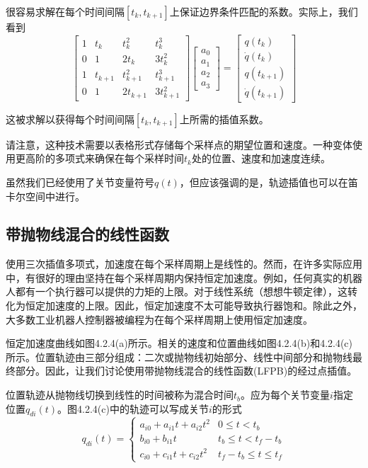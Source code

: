 \documentclass[UTF8]{ctexart}
\theoremstyle{definition}
\begin{document}
很容易求解在每个时间间隔$[t_k, t_{k+1}]$上保证边界条件匹配的系数。实际上，我们看到
\begin{equation}
    \begin{bmatrix} 1 & t_k & t_k^2 & t_k^3 \\ 0 & 1 & 2t_k & 3t_k^2 \\ 1 & t_{k+1} & t_{k+1}^2 & t_{k+1}^3 \\ 0 & 1 & 2t_{k+1} & 3t_{k+1}^2 \end{bmatrix} \begin{bmatrix} a_0 \\ a_1 \\ a_2 \\ a_3 \end{bmatrix} = \begin{bmatrix} q(t_k) \\ \dot{q}(t_k) \\ q(t_{k+1}) \\ \dot{q}(t_{k+1}) \end{bmatrix}
\end{equation}

这被求解以获得每个时间间隔$[t_k, t_{k+1}]$上所需的插值系数。

请注意，这种技术需要以表格形式存储每个采样点的期望位置和速度。一种变体使用更高阶的多项式来确保在每个采样时间$t_k$处的位置、速度和加速度连续。

虽然我们已经使用了关节变量符号$q(t)$，但应该强调的是，轨迹插值也可以在笛卡尔空间中进行。

\subsection{带抛物线混合的线性函数}

使用三次插值多项式，加速度在每个采样周期上是线性的。然而，在许多实际应用中，有很好的理由坚持在每个采样周期内保持恒定加速度。例如，任何真实的机器人都有一个执行器可以提供的力矩的上限。对于线性系统（想想牛顿定律），这转化为恒定加速度的上限。因此，恒定加速度不太可能导致执行器饱和。除此之外，大多数工业机器人控制器被编程为在每个采样周期上使用恒定加速度。

恒定加速度曲线如图4.2.4(a)所示。相关的速度和位置曲线如图4.2.4(b)和4.2.4(c)所示。位置轨迹由三部分组成：二次或抛物线初始部分、线性中间部分和抛物线最终部分。因此，让我们讨论使用带抛物线混合的线性函数(LFPB)的经过点插值。

位置轨迹从抛物线切换到线性的时间被称为混合时间$t_b$。应为每个关节变量$i$指定位置$q_{di}(t)$。图4.2.4(c)中的轨迹可以写成关节$i$的形式
\begin{equation}
    q_{di}(t) = \begin{cases}
        a_{i0} + a_{i1}t + a_{i2}t^2 & 0 \leq t < t_b \\
        b_{i0} + b_{i1}t & t_b \leq t < t_f - t_b \\
        c_{i0} + c_{i1}t + c_{i2}t^2 & t_f - t_b \leq t \leq t_f
    \end{cases}
\end{equation}
\end{document}
